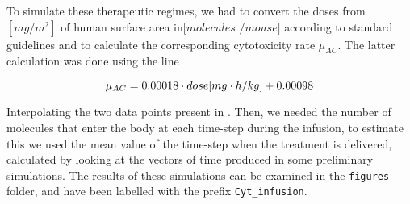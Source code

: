 To simulate these therapeutic regimes, we had to convert the doses from $[mg / m^2]$ of human surface area in$[molecules$ $/mouse]$ according to standard guidelines \cite{dose-conversion} and to calculate the corresponding cytotoxicity rate $\mu_{AC}$. The latter calculation was done using the line 

$$ \mu_{AC} = 0.00018 \cdot \small{dose} [mg \cdot h/kg]+ 0.00098 $$

Interpolating the two data points present in \cite{main-paper}. 
Then, we needed the number of molecules that enter the body at each time-step during the infusion, to estimate this we used the mean value of the time-step when the treatment is delivered, calculated by looking at the vectors of time produced in some preliminary simulations. The results of these simulations can be examined in the \texttt{figures} folder, and have been labelled with the prefix \texttt{Cyt\_infusion}. 

